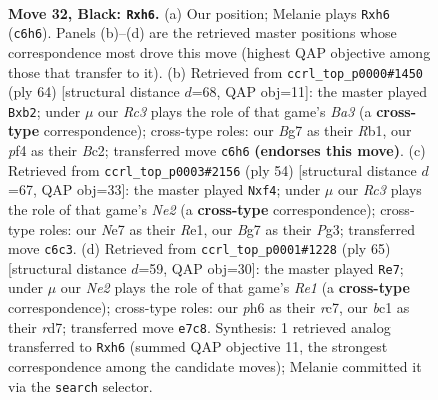 \documentclass[11pt]{article}
\begin{document}
\clearpage

\begin{figure}[p]\centering
\begin{subfigure}{0.46\textwidth}\centering
\resizebox{\linewidth}{!}{%
\newchessgame
\chessboard[
  setfen={r5k1/p3n1b1/Ppr4P/5p1R/4pP2/8/4B3/1RB1K3 b - - 0 32},
  showmover=false,
  pgfstyle=straightmove, color=movearrow, markmove={c6-h6}
]}
\caption{}
\end{subfigure}\hfill
\begin{subfigure}{0.46\textwidth}\centering
\resizebox{\linewidth}{!}{%
\newchessgame
\chessboard[
  setfen={2b3k1/3n1pb1/6p1/3P4/5r1p/B3N2P/1pB2PP1/1R4K1 w - - 4 33},
  showmover=false,
  pgfstyle=straightmove, color=movearrow, markmove={a3-b2}
]}
\caption{}
\end{subfigure}
\\[4pt]
\begin{subfigure}{0.46\textwidth}\centering
\resizebox{\linewidth}{!}{%
\newchessgame
\chessboard[
  setfen={r5k1/5p1p/1Brbb1p1/P7/4Rp1P/2P3P1/4N3/4R1K1 w - - 0 28},
  showmover=false,
  pgfstyle=straightmove, color=movearrow, markmove={e2-f4}
]}
\caption{}
\end{subfigure}\hfill
\begin{subfigure}{0.46\textwidth}\centering
\resizebox{\linewidth}{!}{%
\newchessgame
\chessboard[
  setfen={4r1k1/2RR1pp1/2n4p/4p3/1b2r1PP/4B3/5PKN/8 b - - 2 33},
  showmover=false,
  pgfstyle=straightmove, color=movearrow, markmove={e8-e7}
]}
\caption{}
\end{subfigure}
\caption{\textbf{Move 32, Black: \texttt{Rxh6}.} (a) Our position; Melanie plays \texttt{Rxh6} (\texttt{c6h6}). Panels (b)--(d) are the retrieved master positions whose correspondence most drove this move (highest QAP objective among those that transfer to it). (b) Retrieved from \texttt{ccrl\_top\_p0000\#1450} (ply 64) [structural distance $d$=68, QAP obj=11]: the master played \texttt{Bxb2}; under $\mu$ our \emph{Rc3} plays the role of that game's \emph{Ba3} (a \textbf{cross-type} correspondence); cross-type roles: our \emph{B}g7 as their \emph{R}b1, our \emph{p}f4 as their \emph{B}c2; transferred move \texttt{c6h6} \textbf{(endorses this move)}. (c) Retrieved from \texttt{ccrl\_top\_p0003\#2156} (ply 54) [structural distance $d$=67, QAP obj=33]: the master played \texttt{Nxf4}; under $\mu$ our \emph{Rc3} plays the role of that game's \emph{Ne2} (a \textbf{cross-type} correspondence); cross-type roles: our \emph{N}e7 as their \emph{R}e1, our \emph{B}g7 as their \emph{P}g3; transferred move \texttt{c6c3}. (d) Retrieved from \texttt{ccrl\_top\_p0001\#1228} (ply 65) [structural distance $d$=59, QAP obj=30]: the master played \texttt{Re7}; under $\mu$ our \emph{Ne2} plays the role of that game's \emph{Re1} (a \textbf{cross-type} correspondence); cross-type roles: our \emph{p}h6 as their \emph{r}c7, our \emph{b}c1 as their \emph{r}d7; transferred move \texttt{e7c8}. Synthesis: 1 retrieved analog transferred to \texttt{Rxh6} (summed QAP objective 11, the strongest correspondence among the candidate moves); Melanie committed it via the \texttt{search} selector.}
\label{fig:thought-m63}
\end{figure}
\end{document}
